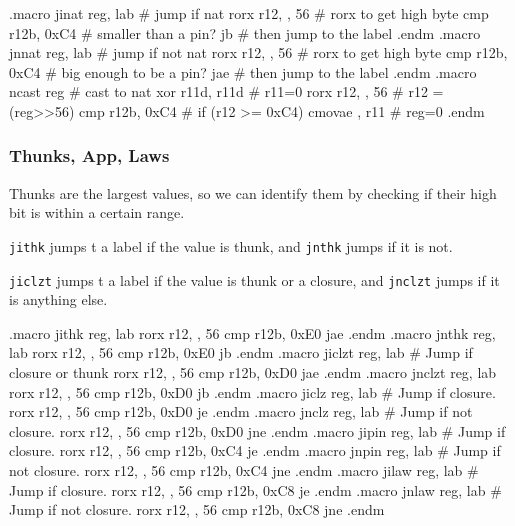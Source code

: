 \begin{asm}
.macro jinat reg, lab                       # jump if nat
	rorx	r12, \reg, 56               # rorx to get high byte
	cmp	r12b, 0xC4                  # smaller than a pin?
	jb	\lab                        # then jump to the label
.endm
.macro jnnat reg, lab                       # jump if not nat
	rorx	r12, \reg, 56               # rorx to get high byte
	cmp	r12b, 0xC4                  # big enough to be a pin?
	jae	\lab                        # then jump to the label
.endm
.macro ncast reg                            # cast to nat
	xor	r11d, r11d                  # r11=0
	rorx	r12, \reg, 56               # r12 = (reg>>56)
	cmp	r12b, 0xC4                  # if (r12 >= 0xC4)
	cmovae	\reg, r11                   #   reg=0
.endm
\end{asm}


\subsubsection{Thunks, App, Laws}

Thunks are the largest values, so we can identify them by checking if
their high bit is within a certain range.

\lstinline|jithk| jumps t a label if the value is thunk, and
\lstinline|jnthk| jumps if it is not.

\lstinline|jiclzt| jumps t a label if the value is thunk or a closure,
and \lstinline|jnclzt| jumps if it is anything else.


\begin{asm}
.macro jithk reg, lab
	rorx	r12, \reg, 56
	cmp	r12b, 0xE0
	jae	\lab
.endm
.macro jnthk reg, lab
	rorx	r12, \reg, 56
	cmp	r12b, 0xE0
	jb	\lab
.endm
.macro jiclzt reg, lab                      # Jump if closure or thunk
	rorx	r12, \reg, 56
	cmp	r12b, 0xD0
	jae	\lab
.endm
.macro jnclzt reg, lab
	rorx	r12, \reg, 56
	cmp	r12b, 0xD0
	jb	\lab
.endm
.macro jiclz reg, lab                       # Jump if closure.
	rorx	r12, \reg, 56
	cmp	r12b, 0xD0
	je	\lab
.endm
.macro jnclz reg, lab                       # Jump if not closure.
	rorx	r12, \reg, 56
	cmp	r12b, 0xD0
	jne	\lab
.endm
.macro jipin reg, lab                       # Jump if closure.
	rorx	r12, \reg, 56
	cmp	r12b, 0xC4
	je	\lab
.endm
.macro jnpin reg, lab                       # Jump if not closure.
	rorx	r12, \reg, 56
	cmp	r12b, 0xC4
	jne	\lab
.endm
.macro jilaw reg, lab                       # Jump if closure.
	rorx	r12, \reg, 56
	cmp	r12b, 0xC8
	je	\lab
.endm
.macro jnlaw reg, lab                       # Jump if not closure.
	rorx	r12, \reg, 56
	cmp	r12b, 0xC8
	jne	\lab
.endm
\end{asm}

